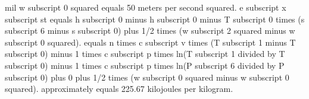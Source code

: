 mil w subscript 0 squared equals 50 meters per second squared.
e subscript x subscript st equals h subscript 0 minus h subscript 0 minus T subscript 0 times (s subscript 6 minus s subscript 0) plus 1/2 times (w subscript 2 squared minus w subscript 0 squared).
equals n times c subscript v times (T subscript 1 minus T subscript 0) minus 1 times c subscript p times ln(T subscript 1 divided by T subscript 0) minus 1 times c subscript p times ln(P subscript 6 divided by P subscript 0) plus 0 plus 1/2 times (w subscript 0 squared minus w subscript 0 squared).
approximately equals 225.67 kilojoules per kilogram.
